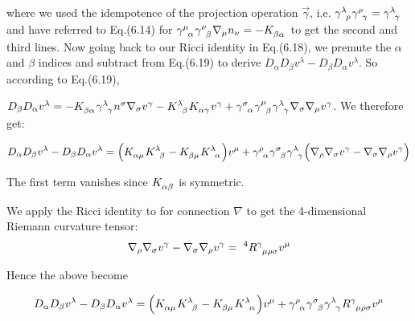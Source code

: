 \documentclass[12pt]{article}
\numberwithin{equation}{section}
\numberwithin{theorem}{subsection}
\begin{document}
where we used the idempotence of the projection operation $\overrightarrow{\gamma}$, i.e. $\tensor{\gamma}{^\lambda_\rho}\tensor{\gamma}{^\rho_\gamma}=\tensor{\gamma}{^\lambda_\gamma}$ and have referred to Eq.(6.14) for $\tensor{\gamma}{^\mu_\alpha}\tensor{\gamma}{^\nu_\beta}\nabla_{\mu}n_{\nu} = - \tensor{K}{_\beta_\alpha}$ to get the second and third lines. Now going back to our Ricci identity in Eq.(6.18), we premute the $\alpha$ and $\beta$ indices and subtract from Eq.(6.19) to derive $D_{\alpha}D_{\beta}v^{\lambda}-D_{\beta}D_{\alpha}v^{\lambda}$. So according to Eq.(6.19),

$D_{\beta}D_{\alpha}v^{\lambda} = -\tensor{K}{_\beta_\alpha}\tensor{\gamma}{^\lambda_\gamma}n^{\sigma}\nabla_{\sigma}v^{\gamma} - \tensor{K}{^\lambda_\beta}\tensor{K}{_\alpha_\gamma}v^{\gamma}+\tensor{\gamma}{^\sigma_\alpha}\tensor{\gamma}{^\mu_\beta}\tensor{\gamma}{^\lambda_\gamma}\nabla_{\sigma}\nabla_{\mu}v^{\gamma}$. We therefore get:

\begin{equation*}

  D_{\alpha}D_{\beta}v^{\lambda}-D_{\beta}D_{\alpha}v^{\lambda} = \Big(\tensor{K}{_\alpha_\mu}\tensor{K}{^\lambda_\beta} - \tensor{K}{_\beta_\mu}\tensor{K}{^\lambda_\alpha} \Big)v^{\mu} + \tensor{\gamma}{^\rho_\alpha}\tensor{\gamma}{^\sigma_\beta}\tensor{\gamma}{^\lambda_\gamma}\Big(\nabla_{\rho}\nabla_{\sigma}v^{\gamma}-\nabla_{\sigma}\nabla_{\rho}v^{\gamma}\Big)

\end{equation*}

The first term vanishes since $\tensor{K}{_\alpha_\beta}$ is symmetric.

We apply the Ricci identity to for connection $\nabla$ to get the 4-dimensional Riemann curvature tensor: $$\nabla_{\rho}\nabla_{\sigma}v^{\gamma}-\nabla_{\sigma}\nabla_{\rho}v^{\gamma}= \; ^{4}\tensor{R}{^\gamma_\mu_\rho_\sigma}v^{\mu}$$

Hence the above become 

\begin{equation*}

     D_{\alpha}D_{\beta}v^{\lambda}-D_{\beta}D_{\alpha}v^{\lambda} = \Big(\tensor{K}{_\alpha_\mu}\tensor{K}{^\lambda_\beta} - \tensor{K}{_\beta_\mu}\tensor{K}{^\lambda_\alpha} \Big)v^{\mu} + \tensor{\gamma}{^\rho_\alpha}\tensor{\gamma}{^\sigma_\beta}\tensor{\gamma}{^\lambda_\gamma}\tensor{R}{^\gamma_\mu_\rho_\sigma}v^{\mu}

\end{equation*}
\end{document}
